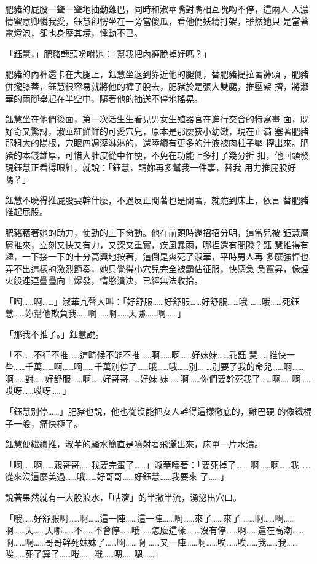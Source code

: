 肥豬的屁股一聳一聳地抽動雞巴，同時和淑華嘴對嘴相互吮吻不停，這兩人
人濃情蜜意卿憐我愛，鈺慧卻愣坐在一旁當傻瓜，看他們妖精打架，雖然她只
是當著電燈泡，卻也身歷其境，悸動不已。

「鈺慧，」肥豬轉頭吩咐她：「幫我把內褲脫掉好嗎？」

肥豬的內褲還卡在大腿上，鈺慧坐退到靠近他的腿側，替肥豬提拉著褲頭
，肥豬併攏膝蓋，鈺慧很容易就將他的褲子脫去，肥豬於是張大雙腿，推壓架
擠，將淑華的兩腳舉起在半空中，隨著他的抽送不停地搖晃。

鈺慧坐在他們後面，第一次活生生看見男女生殖器官在進行交合的特寫畫
面，既好奇又驚訝，淑華紅鮮鮮的可愛穴兒，原本是那麼狹小幼嫩，現在正滿
塞著肥豬那粗大的陽根，穴眼四週溼淋淋的，還陸續有更多的汁液被肉柱子壓
搾出來。肥豬的本錢雄厚，可惜大肚皮從中作梗，不免在功能上多打了幾分折
扣，他回頭發現鈺慧正看得眼紅，就說：「鈺慧，請妳再多幫我一件事，替我
用力推屁股好嗎？」

鈺慧不曉得推屁股要幹什麼，不過反正閒著也是閒著，就跪到床上，依言
替肥豬推起屁股。

肥豬藉著她的助力，使勁的上下肏動。他在前頭時還招招分明，這當兒被
鈺慧層層推來，立刻又快又有力，又深又重實，疾風暴雨，哪裡還有間隙？鈺
慧推得有趣，一下接一下的十分高興地按著，這倒是爽死了淑華，平時男人再
多麼強悍也弄不出這樣的激烈節奏，她只覺得小穴兒完全被霸佔征服，快感急
急竄昇，像煙火般連連疊疊向上爆發，情慾潰決，已經無法收拾。

「啊……啊……」淑華亢聲大叫：「好舒服……好舒服……好舒服……哦
……哦……死鈺慧……妳幫他欺負我……啊……啊……天哪……啊……」

「那我不推了。」鈺慧說。

「不……不行不推……這時候不能不推……啊……啊……好妹妹……乖鈺
慧……推快一些……千萬……啊……啊……千萬別停了……哦……哦……別…
…別要了我的命兒……啊……啊……對……好舒服……啊……好哥哥……好妹
妹……啊……你們要幹死我了……啊……啊……哎呀……哎呀……」

「鈺慧別停……」肥豬也說，他也從沒能把女人幹得這樣徹底的，雞巴硬
的像鐵棍子一般，痛快極了。

鈺慧便繼續推，淑華的騷水簡直是噴射著飛灑出來，床單一片水漬。

「啊……啊……親哥哥……我要完蛋了……」淑華嚷著：「要死掉了……
啊……啊……我……從來沒這麼美過……哦……好哥哥……好鈺慧……我要來
了……」

說著果然就有一大股浪水，「咕濟」的半撒半流，湧泌出穴口。

「哦……好舒服啊……啊……這一陣……這一陣……啊……來了……來了
……啊……啊……啊……天……天哪……不……不會停……哦……怎麼這樣…
…沒有停……啊……還在高潮……啊……啊……哥哥幹死妹妹了……啊……啊
……又一陣……啊……唉……唉……我……我……唉……死了算了……哦……
哦……嗯……嗯……」

